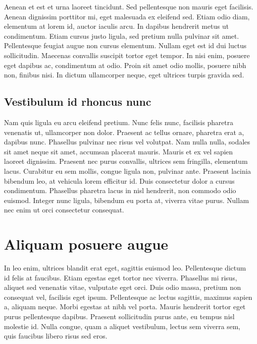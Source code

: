 \documentclass[a4paper, 12pt, notitlepage]{report}
\begin{document}
    Aenean et est et urna laoreet tincidunt. Sed pellentesque non mauris eget facilisis. Aenean dignissim porttitor mi, eget malesuada ex eleifend sed. Etiam odio diam, elementum at lorem id, auctor iaculis arcu. In dapibus hendrerit metus ut condimentum. Etiam cursus justo ligula, sed pretium nulla pulvinar sit amet. Pellentesque feugiat augue non cursus elementum. Nullam eget est id dui luctus sollicitudin. Maecenas convallis suscipit tortor eget tempor. In nisi enim, posuere eget dapibus ac, condimentum at odio. Proin sit amet odio mollis, posuere nibh non, finibus nisi. In dictum ullamcorper neque, eget ultrices turpis gravida sed. 

    \section{Vestibulum id rhoncus nunc}

    Nam quis ligula eu arcu eleifend pretium. Nunc felis nunc, facilisis pharetra venenatis ut, ullamcorper non dolor. Praesent ac tellus ornare, pharetra erat a, dapibus nunc. Phasellus pulvinar nec risus vel volutpat. Nam nulla nulla, sodales sit amet neque sit amet, accumsan placerat mauris. Mauris et ex vel sapien laoreet dignissim. Praesent nec purus convallis, ultrices sem fringilla, elementum lacus. Curabitur eu sem mollis, congue ligula non, pulvinar ante. Praesent lacinia bibendum leo, at vehicula lorem efficitur id. Duis consectetur dolor a cursus condimentum. Phasellus pharetra lacus in nisl hendrerit, non commodo odio euismod. Integer nunc ligula, bibendum eu porta at, viverra vitae purus. Nullam nec enim ut orci consectetur consequat. 

    \chapter{Aliquam posuere augue}
    \thispagestyle{fancy}

    In leo enim, ultrices blandit erat eget, sagittis euismod leo. Pellentesque dictum id felis at faucibus. Etiam egestas eget tortor nec viverra. Phasellus mi risus, aliquet sed venenatis vitae, vulputate eget orci. Duis odio massa, pretium non consequat vel, facilisis eget ipsum. Pellentesque ac lectus sagittis, maximus sapien a, aliquam neque. Morbi egestas at nibh vel porta. Mauris hendrerit tortor eget purus pellentesque dapibus. Praesent sollicitudin purus ante, eu tempus nisl molestie id. Nulla congue, quam a aliquet vestibulum, lectus sem viverra sem, quis faucibus libero risus sed eros.
\end{document}
